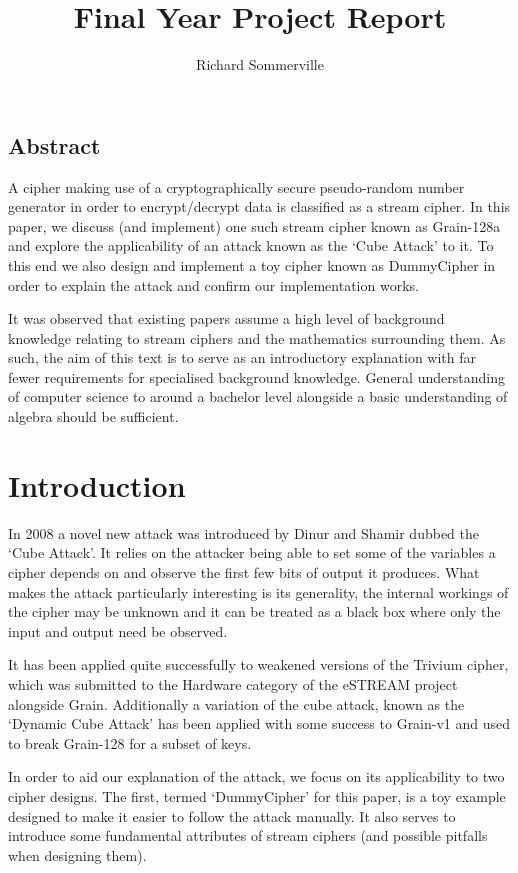 \documentclass{report}
\title{Final Year Project Report}
\author{Richard Sommerville}
\date{}
\let\Oldsection\section
\renewcommand{\section}{\FloatBarrier\Oldsection}
\begin{document}
\maketitle
\tableofcontents
\section{Abstract}
A cipher making use of a cryptographically secure pseudo-random number generator in order to encrypt/decrypt data is classified as a stream cipher\cite{streamcipherDef}. In this paper, we discuss (and implement) one such stream cipher known as Grain-128a and explore the applicability of an attack known as the `Cube Attack' to it. To this end we also design and implement a toy cipher known as DummyCipher in order to explain the attack and confirm our implementation works.

It was observed that existing papers assume a high level of background knowledge relating to stream ciphers and the mathematics surrounding them\cite{DinurShamir2009}\cite{DynamicCube128}\cite{MobiusTransform}. As such, the aim of this text is to serve as an introductory explanation with far fewer requirements for specialised background knowledge. General understanding of computer science to around a bachelor level alongside a basic understanding of algebra should be sufficient.
\chapter{Introduction}
In 2008 a novel new attack was introduced by Dinur and Shamir\cite{DinurShamir2009} dubbed the `Cube Attack'. It relies on the attacker being able to set some of the variables a cipher depends on and observe the first few bits of output it produces. What makes the attack particularly interesting is its generality, the internal workings of the cipher may be unknown and it can be treated as a black box where only the input and output need be observed.

It has been applied quite successfully to weakened versions of the Trivium cipher\cite{DinurShamir2009}\cite{MobiusTransform}, which was submitted to the Hardware category of the eSTREAM project alongside Grain\cite{eStreamPort}. Additionally a variation of the cube attack, known as the `Dynamic Cube Attack' has been applied with some success to Grain-v1\cite{cryptoeprint:2010:570} and used to break Grain-128 for a subset of keys\cite{DynamicCube128}.

In order to aid our explanation of the attack, we focus on its applicability to two cipher designs. The first, termed `DummyCipher' for this paper, is a toy example designed to make it easier to follow the attack manually. It also serves to introduce some fundamental attributes of stream ciphers (and possible pitfalls when designing them).
\end{document}
